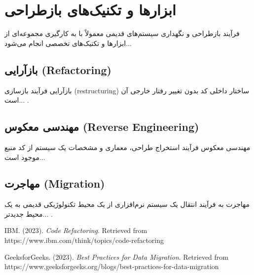 \section{ابزارها و تکنیک‌های بازطراحی}
\label{section:5}

فرآیند بازطراحی و نگهداری سیستم‌های قدیمی معمولاً با به کارگیری مجموعه‌ای از ابزارها و تکنیک‌های تخصصی انجام می‌شود...

\subsection{بازآرایی (Refactoring)}
بازآرایی فرآیند بازسازی (restructuring) ساختار داخلی کد بدون تغییر رفتار خارجی آن است... \cite{ibm-refactoring}.

\subsection{مهندسی معکوس (Reverse Engineering)}
مهندسی معکوس فرآیند استخراج طراحی، معماری و مشخصات یک سیستم از کد منبع موجود است...

\subsection{مهاجرت (Migration)}
مهاجرت به فرآیند انتقال یک سیستم نرم‌افزاری از یک محیط تکنولوژیکی قدیمی به یک محیط جدیدتر... \cite{geeks-migration}.

\begin{thebibliography}{9}
IBM. (2023). \textit{Code Refactoring}. Retrieved from https://www.ibm.com/think/topics/code-refactoring

GeeksforGeeks. (2023). \textit{Best Practices for Data Migration}. Retrieved from https://www.geeksforgeeks.org/blogs/best-practices-for-data-migration
\end{thebibliography}
